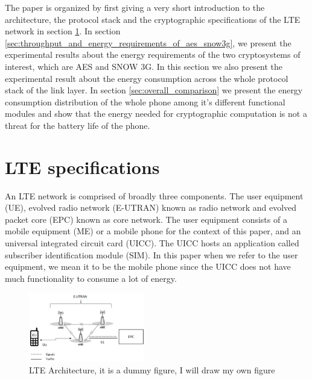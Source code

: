 The paper is organized by first giving a very short introduction to the architecture, the protocol stack and the cryptographic specifications of the LTE network in section \ref{sec:lte_specifications}. In section \ref{sec:throughput_and_energy_requirements_of_aes_snow3g}, we present the experimental results about the energy requirements of the two cryptosystems of interest, which are AES and SNOW 3G. In this section we also present the experimental result about the energy consumption across the whole protocol stack of the link layer. In section \ref{sec:overall_comparison} we present the energy consumption distribution of the whole phone among it's different functional modules and show that the energy needed for cryptographic computation is not a threat for the battery life of the phone. 


\section{LTE specifications}
\label{sec:lte_specifications}
An LTE network is comprised of broadly three components. The user equipment (UE), evolved radio network (E-UTRAN) known as radio network and evolved packet core (EPC) known as core network. The user equipment consists of a mobile equipment (ME) or a mobile phone for the context of this paper, and an universal integrated circuit card (UICC). The UICC hosts an application called subscriber identification module (SIM). In this paper when we refer to the user equipment, we mean it to be the mobile phone since the UICC does not have much functionality to consume a lot of energy.

\begin{figure}
  \includegraphics[width=0.45\textwidth]{lte_architecture.jpg}
\caption{LTE Architecture, it is a dummy figure, I will draw my own figure}
\label{fig:protocl_stack}       %
\end{figure}

